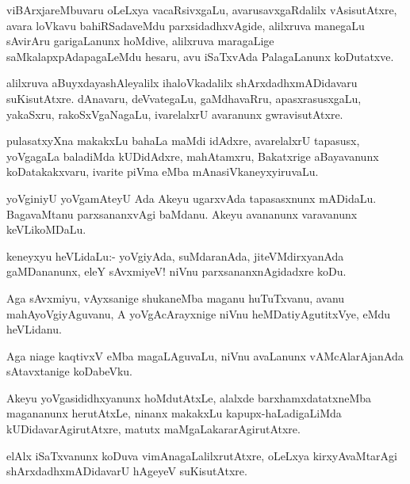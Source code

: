 \documentclass{article}
\begin{document}
\begin{mn}%
viBArxjareMbuvaru oLeLxya vacaRsivxgaLu, avarusavxgaRdalilx
vAsisutAtxre, avara loVkavu bahiRSadaveMdu parxsidadhxvAgide,
alilxruva manegaLu sAvirAru garigaLanunx hoMdive, alilxruva maragaLige
saMkalapxpAdapagaLeMdu hesaru, avu iSaTxvAda PalagaLanunx koDutatxve.
\end{mn}

\begin{mn}
alilxruva aBuyxdayashAleyalilx ihaloVkadalilx shArxdadhxmADidavaru
suKisutAtxre. dAnavaru, deVvategaLu, gaMdhavaRru, apasxrasusxgaLu,
yakaSxru, rakoSxVgaNagaLu, ivarelalxrU avaranunx gwravisutAtxre.
\end{mn}

\begin{mn}%
pulasatxyXna makakxLu bahaLa maMdi idAdxre, avarelalxrU tapasusx,
yoVgagaLa baladiMda kUDidAdxre, mahAtamxru, Bakatxrige aBayavanunx
koDatakakxvaru, ivarite piVma eMba mAnasiVkaneyxyiruvaLu.
\end{mn}

\begin{mn}
yoVginiyU yoVgamAteyU Ada Akeyu ugarxvAda tapasasxnunx
mADidaLu. BagavaMtanu parxsananxvAgi baMdanu. Akeyu avananunx
varavanunx keVLikoMDaLu.
\end{mn}

\begin{mn}
keneyxyu heVLidaLu:- yoVgiyAda, suMdaranAda, jiteVMdirxyanAda
gaMDananunx, eleY sAvxmiyeV! niVnu parxsananxnAgidadxre koDu.
\end{mn}

\begin{mn}
Aga sAvxmiyu, vAyxsanige shukaneMba maganu huTuTxvanu, avanu
mahAyoVgiyAguvanu, A yoVgAcArayxnige niVnu heMDatiyAgutitxVye, eMdu heVLidanu.
\end{mn}

\begin{mn}
Aga niage kaqtivxV eMba magaLAguvaLu, niVnu avaLanunx vAMcAlarAjanAda
sAtavxtanige koDabeVku.
\end{mn}

\begin{mn}%
Akeyu yoVgasididhxyanunx hoMdutAtxLe, alalxde barxhamxdatatxneMba
magananunx herutAtxLe, ninanx makakxLu kapupx-haLadigaLiMda
kUDidavarAgirutAtxre, matutx maMgaLakararAgirutAtxre.
\end{mn}

\begin{mn}
elAlx iSaTxvanunx koDuva vimAnagaLalilxrutAtxre, oLeLxya
kirxyAvaMtarAgi shArxdadhxmADidavarU hAgeyeV suKisutAtxre.
\end{mn}
\end{document}
